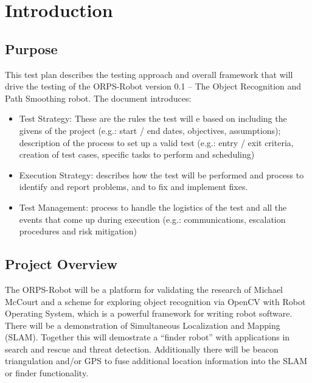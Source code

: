 \documentclass[english,12pt]{article}
\begin{document}
\section{Introduction}
\subsection{Purpose}
This test plan describes the testing approach and overall 
framework that will drive the testing of the ORPS-Robot 
version 0.1 – The Object Recognition and Path Smoothing 
robot. The document introduces:
\begin{itemize}
	\item[] Test Strategy: These are the rules the test will e based on including 
    the givens of the project (e.g.: start / end dates, objectives, assumptions); 
    description of the process to set up a valid test (e.g.: entry / exit criteria, 
    creation of test cases, specific tasks to perform and scheduling)
	\item[] Execution Strategy: describes how the test will be performed 
    and process to identify and report problems, and to fix and implement 
    fixes.
    \item[] Test Management: process to handle the logistics of the test 
    and all the events that come up during execution (e.g.: communications, 
    escalation procedures and risk mitigation)
\end{itemize}
\subsection{Project Overview}
The ORPS-Robot will be a platform for validating the research of Michael McCourt 
and a scheme for exploring object recognition via OpenCV with Robot Operating System, 
which is a powerful framework for writing robot software. There will be a demonstration 
of Simultaneous Localization and Mapping (SLAM). Together this will demostrate a ``finder
robot'' with applications in search and rescue and threat detection. Additionally there 
will be beacon triangulation and/or GPS to fuse additional location information into the 
SLAM or finder functionality.
\end{document}
